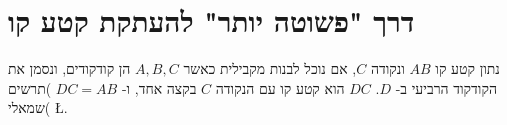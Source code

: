 \begin{comment}
\section{%
חקר הבניות עם גיאוגברה%
}
הכנתי קבצי גיאוגברה עבור שתי הבניות:
\begin{center}
\L{\texttt{compass-equivalency.ggb, rusty-compass.ggb}}.
\end{center}
ניתן להזיז את הנקודות
$A,B,C$
כדי לראות איך הציור משתנה, ולמדוד את שני אורכים כדי לבדוק אם הם שווים.

\textbf{%
שימו לב:%
}
בבנייה של אוקלידס, אם מתחילים עם 
$AB<AC$,
מזיזים את
$C$
כך ש-%
$AB>AC$
וחוזרים, התצוגה מתקלקלת. הסיבה היא שכאשר
$AB<AB$,
לקרן
$DA$
יש שתי נקודות חיתוך עם המעגל שמרכזו
$A$.
כאשר חוזרים למצב ש-%
$AB<AC$
נאבד נקודת החיתוך. כדי להתגבר על הבעייה הכנתי שני קבצים עבור שני מצבים.

\end{comment}

\section{
דרך "פשוטה יותר" להעתקת קטע קו
}

נתון קטע קו 
$AB$
ונקודה
$C$,
אם נוכל לבנות מקבילית כאשר
$A,B,C$
הן קודקודים, ונסמן את הקודקוד הרביעי ב-%
$D$.
$DC$
הוא קטע קו עם הנקודה
$C$
בקצה אחד, ו-%
$DC=AB$
)תרשים שמאלי(
\L{\cite[%
207--208
%
]{roads}}.

\vspace{-1ex}

